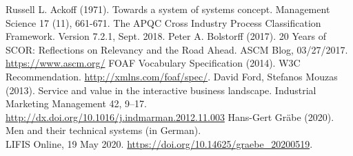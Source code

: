 \documentclass[11pt,a4paper]{article}
\begin{document}
\raggedright
\begin{thebibliography}{xxx}
 Russell L. Ackoff (1971). Towards a system of systems
  concept.  Management Science 17 (11), 661-671.
 The APQC Cross Industry Process Classification Framework.
  Version 7.2.1, Sept. 2018.
 Peter A. Bolstorff (2017).  20 Years of SCOR:
  Reflections on Relevancy and the Road Ahead. ASCM Blog, 03/27/2017.
  \url{https://www.ascm.org/}
 FOAF Vocabulary Specification (2014). W3C Recommendation.
  \url{http://xmlns.com/foaf/spec/}.
 David Ford, Stefanos Mouzas (2013). Service and value
  in the interactive business landscape. Industrial Marketing Management 42,
  9–17.  \url{http://dx.doi.org/10.1016/j.indmarman.2012.11.003}
 Hans-Gert Gräbe (2020). Men and their technical systems
  (in German).\\ LIFIS Online, 19 May 2020.
  \url{https://doi.org/10.14625/graebe_20200519}.


\end{thebibliography}
\end{document}
